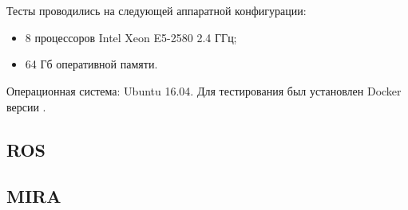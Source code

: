\chapter{}
\section{}
	Тесты проводились на следующей аппаратной конфигурации:
	\begin{itemize}[noitemsep]
		\item 8 процессоров Intel Xeon E5-2580 2.4 ГГц;
		\item 64 Гб оперативной памяти.
	\end{itemize}
	Операционная система: Ubuntu 16.04. Для тестирования был установлен Docker версии .
\section{ROS}
\label{title:chapter3:ros}

\section{}
\label{title:chapter3:yarp}

\section{MIRA}
\label{title:chapter3:mira}

\section{}
\section{}